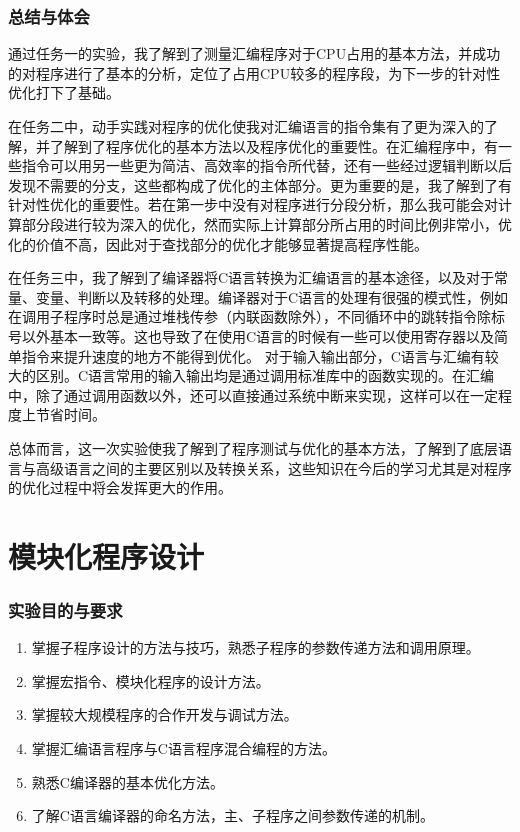\documentclass{article}
\begin{document}
	\newpage
	\section{总结与体会}
	通过任务一的实验，我了解到了测量汇编程序对于CPU占用的基本方法，并成功的对程序进行了基本的分析，定位了占用CPU较多的程序段，为下一步的针对性优化打下了基础。 \par
	在任务二中，动手实践对程序的优化使我对汇编语言的指令集有了更为深入的了解，并了解到了程序优化的基本方法以及程序优化的重要性。在汇编程序中，有一些指令可以用另一些更为简洁、高效率的指令所代替，还有一些经过逻辑判断以后发现不需要的分支，这些都构成了优化的主体部分。更为重要的是，我了解到了有针对性优化的重要性。若在第一步中没有对程序进行分段分析，那么我可能会对计算部分段进行较为深入的优化，然而实际上计算部分所占用的时间比例非常小，优化的价值不高，因此对于查找部分的优化才能够显著提高程序性能。\par
	在任务三中，我了解到了编译器将C语言转换为汇编语言的基本途径，以及对于常量、变量、判断以及转移的处理。编译器对于C语言的处理有很强的模式性，例如在调用子程序时总是通过堆栈传参（内联函数除外），不同循环中的跳转指令除标号以外基本一致等。这也导致了在使用C语言的时候有一些可以使用寄存器以及简单指令来提升速度的地方不能得到优化。
	对于输入输出部分，C语言与汇编有较大的区别。C语言常用的输入输出均是通过调用标准库中的函数实现的。在汇编中，除了通过调用函数以外，还可以直接通过系统中断来实现，这样可以在一定程度上节省时间。 \par
	总体而言，这一次实验使我了解到了程序测试与优化的基本方法，了解到了底层语言与高级语言之间的主要区别以及转换关系，这些知识在今后的学习尤其是对程序的优化过程中将会发挥更大的作用。

\newpage
\part{模块化程序设计}
	\section{实验目的与要求}
	\begin{enumerate}
		\item 掌握子程序设计的方法与技巧，熟悉子程序的参数传递方法和调用原理。
		\item 掌握宏指令、模块化程序的设计方法。
		\item 掌握较大规模程序的合作开发与调试方法。
		\item 掌握汇编语言程序与C语言程序混合编程的方法。
		\item 熟悉C编译器的基本优化方法。
		\item 了解C语言编译器的命名方法，主、子程序之间参数传递的机制。
	\end{enumerate}
\end{document}

